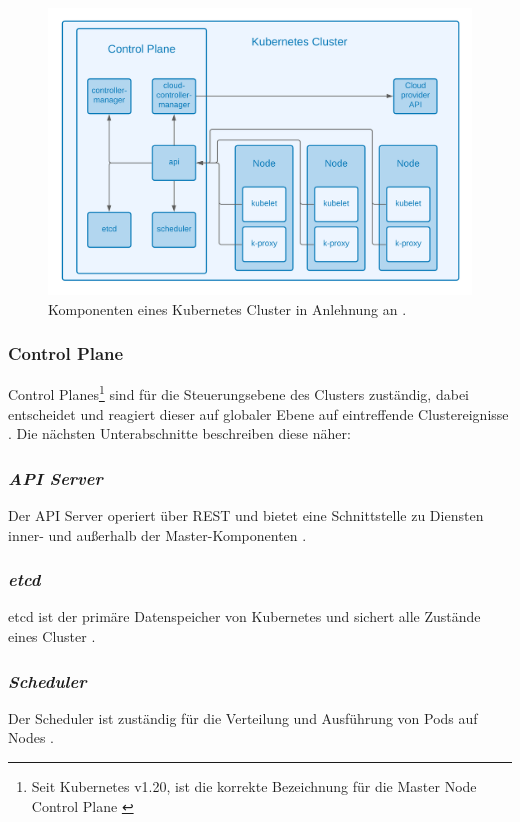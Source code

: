 \begin{figure}
    \centering
    \includegraphics[width=1.0\columnwidth]{images/KubernetesKomponenten.png}
    \caption{Komponenten eines Kubernetes Cluster in Anlehnung an \cite{kubernetesnodekomponenten}.}
    \label{fig:cluster}
\end{figure}

\subsubsection{Control Plane}
Control Planes\footnote{Seit Kubernetes v1.20, ist die korrekte Bezeichnung für die Master Node Control Plane \cite{Kuberneteschangemaster}} sind für die Steuerungsebene des Clusters zuständig,
dabei entscheidet und reagiert dieser auf globaler Ebene auf eintreffende Clustereignisse \cite{kuberneteskomponenten}.
Die nächsten Unterabschnitte beschreiben diese näher:

\subsubsection{\textit{API Server}}
Der API Server operiert über REST und bietet eine Schnittstelle zu Diensten
inner- und außerhalb der Master-Komponenten \cite{kuberneteskomponenten}.

\subsubsection{\textit{etcd}}
etcd ist der primäre Datenspeicher von Kubernetes und sichert alle Zustände eines
Cluster \cite{kuberneteskomponenten}.

\subsubsection{\textit{Scheduler}}
Der Scheduler ist zuständig für die Verteilung und Ausführung von Pods auf Nodes \cite{kuberneteskomponenten}.

